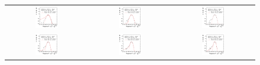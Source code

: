 \begin{figure}[ht]
  \centering
  \begin{tabular}{ccc}
    \includegraphics[width=0.3\textwidth]{figures/ResFit_Spring10QCDFlat_CB_Eta0_MCClosure_PtBin0} &
    \includegraphics[width=0.3\textwidth]{figures/ResFit_Spring10QCDFlat_CB_Eta0_MCClosure_PtBin1} &
    \includegraphics[width=0.3\textwidth]{figures/ResFit_Spring10QCDFlat_CB_Eta0_MCClosure_PtBin2} \\

    \includegraphics[width=0.3\textwidth]{figures/ResFit_Spring10QCDFlat_CB_Eta0_MCClosure_PtBin3} &
    \includegraphics[width=0.3\textwidth]{figures/ResFit_Spring10QCDFlat_CB_Eta0_MCClosure_PtBin4} &
    \includegraphics[width=0.3\textwidth]{figures/ResFit_Spring10QCDFlat_CB_Eta0_MCClosure_PtBin5} \\


\end{tabular}
\end{figure}

